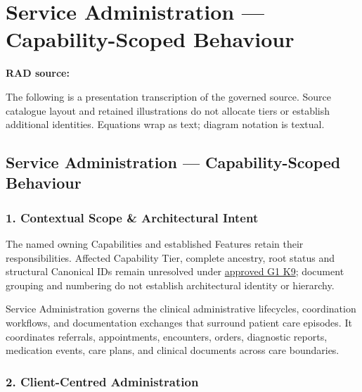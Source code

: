 \chapter{Service Administration — Capability-Scoped Behaviour}\label{rad:sa}
\noindent\textbf{RAD source:} \texttt{}

The following is a presentation transcription of the governed source. Source catalogue layout and retained illustrations do not allocate tiers or establish additional identities. Equations wrap as text; diagram notation is textual.

\label{rad:sa:1}
\section*{Service Administration — Capability-Scoped Behaviour}
\label{rad:sa:3}
\subsection*{1. Contextual Scope \& Architectural Intent}
\label{rad:sa:5}

The named owning Capabilities and established Features retain their responsibilities. Affected Capability Tier, complete ancestry, root status and structural Canonical IDs remain unresolved under \hyperref[rad:k9:1392]{approved G1 K9}; document grouping and numbering do not establish architectural identity or hierarchy.

\label{rad:sa:7}

Service Administration governs the clinical administrative lifecycles, coordination workflows, and documentation exchanges that surround patient care episodes. It coordinates referrals, appointments, encounters, orders, diagnostic reports, medication events, care plans, and clinical documents across care boundaries.

\label{rad:sa:9}

\par\smallskip
{}\label{rad:sa:11}
\subsection*{2. Client-Centred Administration}
\label{rad:sa:12}

